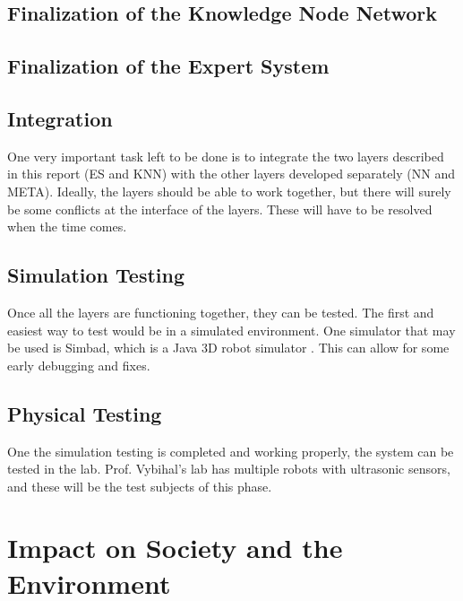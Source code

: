 \documentclass[titlepage,11pt]{article}
\begin{document}
\subsection{Finalization of the Knowledge Node Network}

\subsection{Finalization of the Expert System}

\subsection{Integration}

One very important task left to be done is to integrate the two layers described in this report (ES and KNN) with the other layers developed separately (NN and META). Ideally, the layers should be able to work together, but there will surely be some conflicts at the interface of the layers. These will have to be resolved when the time comes.

\subsection{Simulation Testing}

Once all the layers are functioning together, they can be tested. The first and easiest way to test would be in a simulated environment. One simulator that may be used is Simbad, which is a Java 3D robot simulator \cite{simbad}. This can allow for some early debugging and fixes.

\subsection{Physical Testing}

One the simulation testing is completed and working properly, the system can be tested in the lab. Prof. Vybihal's lab has multiple robots with ultrasonic sensors, and these will be the test subjects of this phase.

\section{Impact on Society and the Environment}
\end{document}
